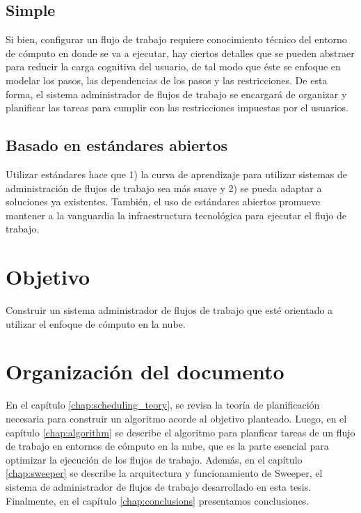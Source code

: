 \subsection{Simple}

Si bien, configurar un flujo de trabajo requiere conocimiento técnico del entorno de cómputo en donde se va a ejecutar, hay ciertos detalles que se pueden abstraer para reducir la carga cognitiva del usuario, de tal modo que éste se enfoque en modelar los pasos, las dependencias de los pasos y las restricciones. De esta forma, el sistema administrador de flujos de trabajo se encargará de organizar y planificar las tareas para cumplir con las restricciones impuestas por el usuarios.


\subsection{Basado en estándares abiertos}

Utilizar estándares hace que 1) la curva de aprendizaje para utilizar sistemas de administración de flujos de trabajo sea más suave y 2) se pueda adaptar a soluciones ya existentes. También, el uso de estándares abiertos promueve mantener a la vanguardia la infraestructura tecnológica para ejecutar el flujo de trabajo.


\section{Objetivo}

Construir un sistema administrador de flujos de trabajo que esté orientado a utilizar el enfoque de cómputo en la nube.

\section{Organización del documento}

En el capítulo \ref{chap:scheduling_teory}, se revisa la teoría de planificación necesaria para construir un algoritmo acorde al objetivo planteado. Luego, en el capítulo \ref{chap:algorithm} se describe el algoritmo para planficar tareas de un flujo de trabajo en entornos de cómputo en la nube, que es la parte esencial para optimizar la ejecución de los flujos de trabajo. Además, en el capítulo \ref{chap:sweeper} se describe la arquitectura y funcionamiento de Sweeper, el sistema de administrador de flujos de trabajo desarrollado en esta tesis. Finalmente, en el capítulo \ref{chap:conclusions} presentamos conclusiones.
